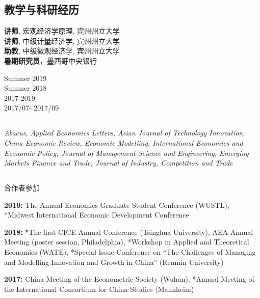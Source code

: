 \documentclass[letterpaper]{article}
\begin{document}
{\subsection*{\bf 教学与科研经历}
\begin{minipage}{0.8\linewidth}
  \textbf{讲师}, 宏观经济学原理, 宾州州立大学 \\
  \textbf{讲师}, 中级计量经济学, 宾州州立大学 \\
  \textbf{助教}, 中级微观经济学, 宾州州立大学 \\
  \textbf{暑期研究员}，墨西哥中央银行
\end{minipage}
\begin{minipage}{0.2\linewidth}
    Summer 2019 \\
    Summer 2018 \\
   2017-2019  \\
  2017/07- 2017/09
\end{minipage}

\subsection*{{}}
      \textit{Abacus, Applied Economics Letters, Asian Journal of Technology Innovation, China Economic Review, Economic Modelling, International Economics and Economic Policy, Journal of Management Science and Engineering, Emerging Markets Finance and Trade, Journal of Industry, Competition and Trade}
      
\subsection*{{}}
{\footnotesize * 合作者参加}
\vspace{1em}

\textbf{2019:} The  Annual Economics Graduate Student Conference (WUSTL), *Midwest International Economic Development Conference

\vspace{0.5em}
\textbf{2018:} *The first CICE Annual Conference (Tsinghua University), AEA Annual Meeting (poster session, Philadelphia), *Workshop in Applied and Theoretical Economics (WATE), *Special Issue Conference on “The Challenges of Managing and Modelling Innovation and Growth in China” (Renmin University)

\vspace{0.5em}
\textbf{2017:} China Meeting of the Econometric Society (Wuhan), *Annual Meeting of the International Consortium for China Studies (Mannheim)

}
\end{document}
